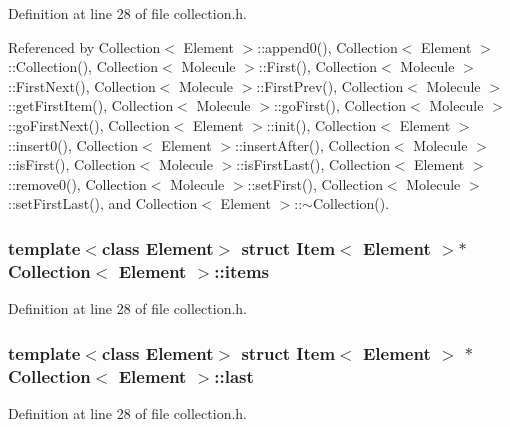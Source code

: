 Definition at line 28 of file collection.h.

Referenced by Collection$<$ Element $>$::append0(), Collection$<$ Element $>$::Collection(), Collection$<$ Molecule $>$::First(), Collection$<$ Molecule $>$::FirstNext(), Collection$<$ Molecule $>$::FirstPrev(), Collection$<$ Molecule $>$::getFirstItem(), Collection$<$ Molecule $>$::goFirst(), Collection$<$ Molecule $>$::goFirstNext(), Collection$<$ Element $>$::init(), Collection$<$ Element $>$::insert0(), Collection$<$ Element $>$::insertAfter(), Collection$<$ Molecule $>$::isFirst(), Collection$<$ Molecule $>$::isFirstLast(), Collection$<$ Element $>$::remove0(), Collection$<$ Molecule $>$::setFirst(), Collection$<$ Molecule $>$::setFirstLast(), and Collection$<$ Element $>$::$\sim$Collection().\hypertarget{classCollection_a0de31b7883b3920f0e049710517b7bb}{
\subsubsection[{items}]{\setlength{\rightskip}{0pt plus 5cm}template$<$class Element$>$ struct {\bf Item}$<$ Element $>$$\ast$ {\bf Collection}$<$ Element $>$::{\bf items}}}
\label{classCollection_a0de31b7883b3920f0e049710517b7bb}




Definition at line 28 of file collection.h.\hypertarget{classCollection_fc2fe7eb6eda33100b7bfd6dedbe38cc}{
\subsubsection[{last}]{\setlength{\rightskip}{0pt plus 5cm}template$<$class Element$>$ struct {\bf Item}$<$ Element $>$ $\ast$ {\bf Collection}$<$ Element $>$::{\bf last}}}
\label{classCollection_fc2fe7eb6eda33100b7bfd6dedbe38cc}




Definition at line 28 of file collection.h.

